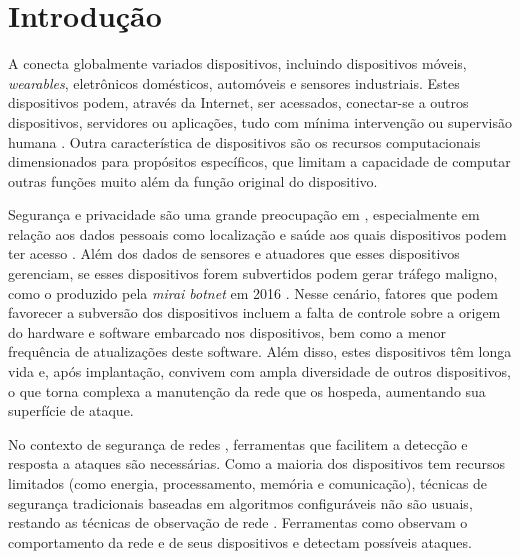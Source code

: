 
\chapter{Introdução}\label{cha:intro}

A \iot conecta globalmente variados dispositivos, incluindo dispositivos móveis,
\emph{wearables}, eletrônicos domésticos, automóveis e sensores industriais.
Estes dispositivos podem, através da Internet, ser acessados, conectar-se a
outros dispositivos, servidores ou aplicações, tudo com mínima intervenção ou
supervisão humana
\cite{Tahsien2020,abane2019,haddadpajouh2019survey,Shanbhag2015}.
Outra característica de dispositivos \iot são os recursos computacionais
dimensionados para propósitos específicos, que limitam a capacidade de computar
outras funções muito além da função original do dispositivo.


Segurança e privacidade são uma grande preocupação em \iot, especialmente em
relação aos dados pessoais como localização e saúde aos quais dispositivos podem ter
acesso \cite{sengupta2020comprehensive}.
Além dos dados de sensores e atuadores que esses dispositivos gerenciam, se esses dispositivos forem
subvertidos podem gerar tráfego maligno, como o produzido pela \emph{mirai botnet} em 2016 \cite{Kambourakis2017,Kolias2017mirai}.
Nesse cenário, fatores que podem favorecer a subversão dos dispositivos incluem
a falta de controle sobre a origem do hardware e software embarcado nos
dispositivos, bem como a menor frequência de atualizações deste software.
Além disso, estes dispositivos têm longa vida e, após implantação, convivem com
ampla diversidade de outros dispositivos, o que torna complexa a manutenção da rede
que os hospeda, aumentando sua superfície de ataque.

No contexto de segurança de redes \iot, ferramentas que facilitem a detecção e
resposta a ataques são necessárias.
Como a maioria dos dispositivos \iot tem recursos limitados (como energia,
processamento, memória e comunicação), técnicas de segurança tradicionais
baseadas em algoritmos configuráveis não são usuais, restando as
técnicas de observação de rede \cite{Zhou2017}.
Ferramentas como \nids observam o comportamento da rede e de seus dispositivos
e detectam possíveis ataques.
% 

